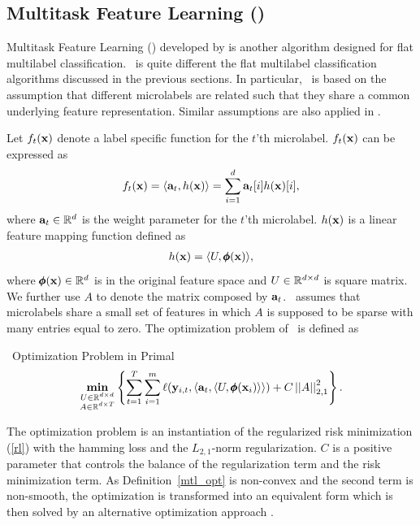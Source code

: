 {%
%
\subsection{Multitask Feature Learning (\mtl)} \label{sc_mtl}

Multitask Feature Learning (\mtl) developed by \citet{Argyriou07multitask} is another algorithm designed for flat multilabel classification.
\mtl\ is quite different the flat multilabel classification algorithms discussed in the previous sections.
In particular, \mtl\ is based on the assumption that different microlabels are related such that they share a common underlying feature representation.
Similar assumptions are also applied in \citep{Caruana97multitask,Baxter00a,BenDavide03exploiting}.

Let $f_t(\mathbf {x})$ denote a label specific function for the $t$'th microlabel.
$f_t(\mathbf {x})$ can be expressed as
\begin{align*}
	f_t(\mathbf {x}) = \langle \mathbf {a}_t, h(\mathbf {x}) \rangle = \sum_{i=1}^{d}\mathbf {a}_{t}[i]h(\mathbf {x})[i],
\end{align*}
where $\mathbf {a}_t\in\mathbb{R}^d$ is the weight parameter for the $t$'th microlabel.
$h(\mathbf {x})$ is a linear feature mapping function defined as
\begin{align*}
	h(\mathbf {x}) = \langle U, \pmb \phi(\mathbf {x}) \rangle,
\end{align*}
where $\pmb \phi(\mathbf {x})\in\mathbb{R}^d$ is in the original feature space and $U\in\mathbb{R}^{d\times d}$ is square matrix.
We further use $A$ to denote the matrix composed by $\mathbf {a}_{t}$.
\mtl\ assumes that microlabels share a small set of features in which $A$ is supposed to be sparse with many entries equal to zero.
The optimization problem of \mtl\ is defined as
\begin{definition}{\mtl\ Optimization Problem in Primal}\label{mtl_opt}
	\begin{align*}
		\underset{\substack{U\in\mathbb{R}^{d\times d}\\A\in\mathbb{R}^{d\times T}}}{\textbf{min}} \left\{\sum_{t=1}^{T}\sum_{i=1}^{m}\ell(\mathbf {y}_{i,t},\langle \mathbf {a}_t, \langle U, \pmb \phi(\mathbf {x}_i) \rangle \rangle)+C\left|\left| A \right|\right|_{2,1}^2\right\}.
	\end{align*}
\end{definition}
\noindent
The optimization problem is an instantiation of the regularized risk minimization (\ref{rl}) with the hamming loss and the $L_{2,1}$-norm regularization.
$C$ is a positive parameter that controls the balance of the regularization term and the risk minimization term.
As Definition~\ref{mtl_opt} is non-convex and the second term is non-smooth, the optimization is transformed into an equivalent form which is then solved by an alternative optimization approach \citep{Argyriou07multitask}.

}
